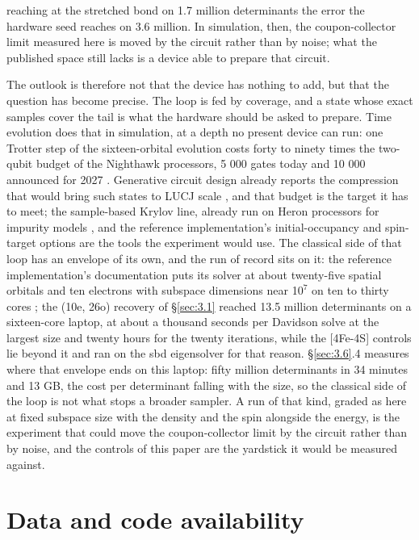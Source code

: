 \documentclass[11pt]{article}
\begin{document}
reaching at the stretched bond on 1.7 million determinants the error the hardware seed reaches on 3.6 million. In simulation, then, the coupon-collector limit measured here is moved by the circuit rather than by noise; what the published space still lacks is a device able to prepare that circuit.

The outlook is therefore not that the device has nothing to add, but that the question has become precise. The loop is fed by coverage, and a state whose exact samples cover the tail is what the hardware should be asked to prepare. Time evolution does that in simulation, at a depth no present device can run: one Trotter step of the sixteen-orbital evolution costs forty to ninety times the two-qubit budget of the Nighthawk processors, 5 000 gates today and 10 000 announced for 2027 \cite{IBMNighthawk2025}. Generative circuit design already reports the compression that would bring such states to LUCJ scale \cite{Kemmoku2026}, and that budget is the target it has to meet; the sample-based Krylov line, already run on Heron processors for impurity models \cite{Yu2025}, and the reference implementation's initial-occupancy and spin-target options \cite{SQDaddon} are the tools the experiment would use. The classical side of that loop has an envelope of its own, and the run of record sits on it: the reference implementation's documentation puts its solver at about twenty-five spatial orbitals and ten electrons with subspace dimensions near 1$0^{7}$ on ten to thirty cores \cite{SQDaddonDocs}; the (10e, 26o) recovery of \S\ref{sec:3.1} reached 13.5 million determinants on a sixteen-core laptop, at about a thousand seconds per Davidson solve at the largest size and twenty hours for the twenty iterations, while the [4Fe-4S] controls lie beyond it and ran on the sbd eigensolver for that reason. \S\ref{sec:3.6}.4 measures where that envelope ends on this laptop: fifty million determinants in 34 minutes and 13 GB, the cost per determinant falling with the size, so the classical side of the loop is not what stops a broader sampler. A run of that kind, graded as here at fixed subspace size with the density and the spin alongside the energy, is the experiment that could move the coupon-collector limit by the circuit rather than by noise, and the controls of this paper are the yardstick it would be measured against.


\section{Data and code availability}\label{sec:5}
\end{document}
